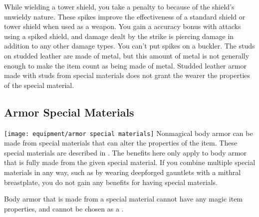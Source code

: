         While wielding a tower shield, you take a  penalty to  because of the shield's unwieldy nature.
         These spikes improve the effectiveness of a standard shield or tower shield when used as a weapon.
        You gain a  accuracy bonus with attacks using a spiked shield, and damage dealt by the strike is piercing damage in addition to any other damage types.
        You can't put spikes on a buckler.
         The studs on studded leather are made of metal, but this amount of metal is not generally enough to make the item count as being made of metal.
        Studded leather armor made with studs from special materials does not grant the wearer the properties of the special material.

    \subsection{Armor Special Materials}\label{Armor Special Materials}
        \texttt{[image: equipment/armor special materials]}
        Nonmagical body armor can be made from special materials that can alter the properties of the item.
        These special materials are described in .
        The benefits here only apply to body armor that is fully made from the given special material.
        If you combine multiple special materials in any way, such as by wearing deepforged gauntlets with a mithral breastplate, you do not gain any benefits for having special materials.

        Body armor that is made from a special material cannot have any magic item properties, and cannot be chosen as a .


